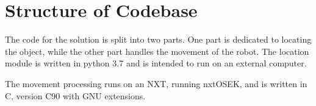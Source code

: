 \section{Structure of Codebase}
The code for the solution is split into two parts.
One part is dedicated to locating the object, while the other part handles the movement of the robot.
The location module is written in python 3{.}7 and is intended to run on an external computer.

The movement processing runs on an NXT, running nxtOSEK, and is written in C, version C90 with GNU extensions.



